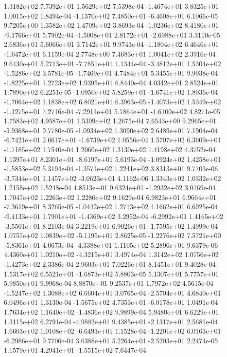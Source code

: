 1.3182e+02 7.7392e+01 1.5629e+02  7.5398e-04
-1.4674e+01  3.8325e+01  1.0015e+02  1.8494e-04
-1.1370e+02  7.4850e+01 -6.4608e+01  6.1066e-05
9.7205e+00 1.3582e+02 1.4709e+02  3.8693e-04
-1.0236e+02  8.4180e+01 -9.1766e+01  5.7902e-04
-1.5008e+01  2.8172e+01 -2.6988e+01  3.3110e-05
2.6836e+01 5.6066e+01 3.7142e+01  9.9743e-04
-1.1804e+02  6.4646e+01 -1.6472e+01  6.1159e-04
2.7748e+00 7.4683e+01 1.0041e+02  2.3916e-04
 9.6430e+01  5.2713e+01 -7.7851e+01  1.1344e-04
-3.4812e+01  1.5304e+02 -1.5286e+02  3.5781e-05
-1.7469e+01  4.7484e+01  5.3455e+01  9.9938e-04
-1.8225e+01  1.2723e+02  1.9395e+01  6.8440e-04
4.0342e+01 2.8524e+01 1.7890e+02  6.2251e-05
-1.0950e+02  5.8259e+01 -1.6741e+02  1.8936e-04
-1.7064e+02  1.1838e+02  6.8021e+01  6.3963e-05
-1.4073e+02  1.5349e+02 -1.1275e+01  7.2716e-04
-7.2911e+01  5.7864e+01 -1.6100e+02  4.8271e-05
1.7583e+02 4.9587e+01 1.5399e+02  1.2675e-04
 7.6543e+00  9.2965e+01 -5.9368e+01  9.7780e-05
-1.0934e+02  1.3090e+02  2.6489e+01  7.1904e-04
-6.7421e+01  2.6617e+01 -1.6739e+02  1.0556e-04
 1.5707e+02  6.3609e+01 -1.7185e+02  1.7540e-04
1.2060e+02 1.3130e+02 1.4198e+02  4.3752e-04
 1.1397e+01  8.2301e+01 -8.6197e+01  5.6193e-04
-1.0924e+02  1.4258e+01 -1.5853e+02  5.3194e-04
-1.3571e+02  1.2241e+02  3.8313e+01  9.7703e-06
-3.7344e+01  1.1457e+02 -3.0623e+01  4.1162e-06
1.3343e+02 1.0332e+02 1.2158e+02  1.5248e-04
 4.8513e+01  9.6324e+01 -1.2932e+02  3.0169e-04
1.7047e+02 1.2263e+02 1.2280e+02  9.1629e-04
 6.9823e+01  6.9664e+01 -7.3619e+01  8.3265e-05
-1.0442e+02  1.2713e+02  4.1662e+01  6.6925e-04
-9.4133e+01  1.7901e+01 -1.4369e+02  3.2952e-04
-6.2992e+01  1.4165e+02 -3.5501e+01  8.2103e-04
 3.2219e+01  6.9026e+01 -1.7595e+02  1.4999e-04
 1.0757e+02  1.0839e+02 -5.1195e+01  2.8625e-05
-1.2276e+02  7.5721e+00 -5.8361e+01  4.0673e-04
-4.3388e+01  1.1105e+02  5.2896e+01  9.6379e-06
 4.4360e+01  1.0210e+02 -4.3215e+01  3.4974e-04
 1.3142e+02  1.0756e+02 -1.4273e+02  2.3386e-04
2.9603e+01 7.0226e+01 8.1451e+01  9.4028e-04
 1.5317e+02  6.5521e+01 -1.6873e+02  5.8803e-05
5.1307e+01 5.7757e+01 5.9850e+01  9.9968e-04
8.8870e+01 9.2537e+01 1.7972e+02  4.5615e-04
-1.5247e+02  1.3088e+02  6.6604e+01  3.0765e-04
-2.5704e+01  4.6840e+01  6.0496e+01  1.3130e-04
-1.5675e+02  4.7353e+01 -6.0178e+01  1.0491e-04
 1.7634e+02  1.1640e+02 -1.4836e+02  9.9899e-04
5.9480e+01 6.6229e+01 1.3115e+02  6.2791e-04
-4.9882e+01  9.4385e+01 -2.1317e+01  2.5681e-04
 1.6603e+02  1.0108e+02 -6.6493e+01  1.1528e-04
-1.2201e+02  6.0163e+01 -6.2986e+01  9.7706e-04
 3.6388e+01  5.2264e+01 -2.5203e+01  2.2474e-05
 1.1579e+01  4.2941e+01 -1.5515e+02  7.6447e-04
